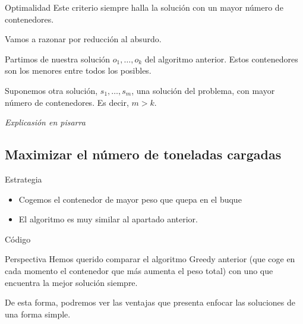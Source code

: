 \begin{frame}{Optimalidad}
Este criterio siempre halla la solución con un mayor número de contenedores.

Vamos a razonar por reducción al absurdo.

\pause
Partimos de nuestra solución  $o_1, \dots, o_k$ del algoritmo anterior. Estos contenedores son los menores entre todos los posibles.

Suponemos otra solución, $s_1, \dots, s_m$, una solución del problema, con mayor número de contenedores. Es decir, $m > k$.


\begin{center}
	\textit{Explicasión en pisarra}
\end{center}
\end{frame}

\subsection{Maximizar el número de toneladas cargadas}

\begin{frame}{Estrategia}
\begin{itemize}
  \item Cogemos el contenedor de mayor peso que quepa en el buque
  \item El algoritmo es muy similar al apartado anterior.
\end{itemize}
\end{frame}

\begin{frame}[fragile]{Código}

\end{frame}

\begin{frame}{Perspectiva}
	Hemos querido comparar el algoritmo Greedy anterior (que coge en cada momento el contenedor que más aumenta el peso total) con uno que encuentra la mejor solución siempre.
	\vspace{1cm}
	
	De esta forma, podremos ver las ventajas que presenta enfocar las soluciones de una forma simple.
\end{frame}

